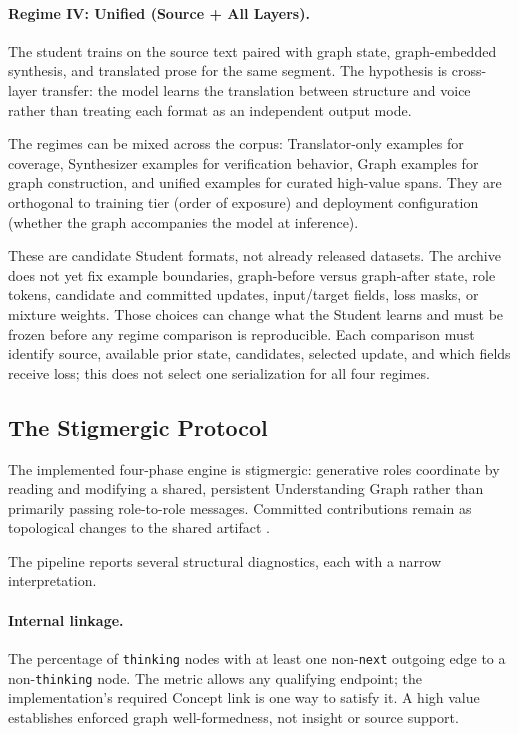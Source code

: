 \paragraph{Regime IV: Unified (Source + All Layers).} The student trains on the
source text paired with graph state, graph-embedded synthesis, and translated
prose for the same segment. The hypothesis is cross-layer transfer: the model
learns the translation between structure and voice rather than treating each
format as an independent output mode.

The regimes can be mixed across the corpus: Translator-only examples for
coverage, Synthesizer examples for verification behavior, Graph examples for
graph construction, and unified examples for curated high-value spans. They
are orthogonal to training tier (order of exposure) and deployment
configuration (whether the graph accompanies the model at inference).

These are candidate Student formats, not already released datasets. The
archive does not yet fix example boundaries, graph-before versus graph-after
state, role tokens, candidate and committed updates, input/target fields, loss
masks, or mixture weights. Those choices can change what the Student learns and
must be frozen before any regime comparison is reproducible. Each comparison must identify source, available prior state, candidates,
selected update, and which fields receive loss; this does not select one
serialization for all four regimes.


\subsection{The Stigmergic Protocol}\label{sec:architectural_validation}

The implemented four-phase engine is stigmergic: generative roles coordinate by
reading and modifying a shared, persistent Understanding Graph rather than
primarily passing role-to-role messages. Committed contributions remain as
topological changes to the shared artifact
\cite{westerberg2026understanding}.

The pipeline reports several structural diagnostics, each with a narrow
interpretation.

\paragraph{Internal linkage.} The percentage of \texttt{thinking} nodes with at
least one non-\texttt{next} outgoing edge to a non-\texttt{thinking} node. The metric
allows any qualifying endpoint; the implementation's required Concept link is
one way to satisfy it. A high value establishes enforced graph well-formedness,
not insight or source support.

